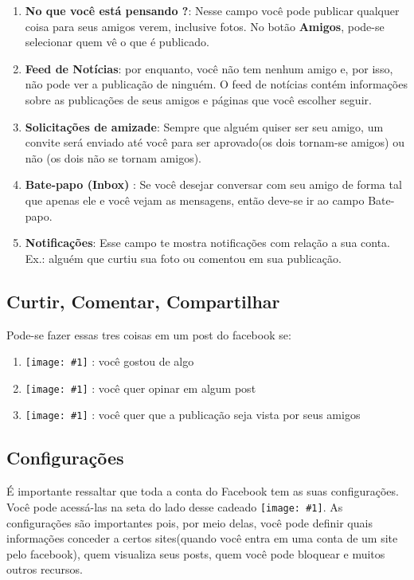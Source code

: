 \documentclass[hidelinks,12pt]{article}
\newcommand{\icon}[1]{\texttt{[image: \#1]}}
\begin{document}
		\begin{enumerate}
			\item \textbf{No que você está pensando ?}: Nesse campo você pode publicar qualquer coisa para seus amigos verem, inclusive fotos. No botão \textbf{Amigos}, pode-se selecionar quem vê o que é publicado.
			\item \textbf{Feed de Notícias}: por enquanto, você não tem nenhum amigo e, por isso, não pode ver a publicação de ninguém. O feed de notícias contém informações sobre as publicações de seus amigos e páginas que você escolher seguir.
			\item \textbf{Solicitações de amizade}: Sempre que alguém quiser ser seu amigo, um convite será enviado até você para ser aprovado(os dois tornam-se amigos) ou não (os dois não se tornam amigos).
			\item \textbf{Bate-papo (Inbox) }: Se você desejar conversar com seu amigo de forma tal que apenas ele e você vejam as mensagens, então deve-se ir ao campo Bate-papo.
			\item \textbf{Notificações}: Esse campo te mostra notificações com relação a sua conta. Ex.: alguém que curtiu sua foto ou comentou em sua publicação.
		\end{enumerate}

		\subsection{Curtir, Comentar, Compartilhar}

			Pode-se fazer essas tres coisas em um post do facebook se:

		\begin{enumerate}
			\item  \icon{Figures/curtir} : você gostou de algo
			\item  \icon{Figures/comentar} : você quer opinar em algum post
			\item  \icon{Figures/compartilhar} : você quer que a publicação seja vista por seus amigos
		\end{enumerate}

		\subsection{Configurações}

		É importante ressaltar que toda a conta do Facebook tem as suas configurações. Você pode acessá-las na seta do lado desse cadeado \icon{Figures/fb5}.
		As configurações são importantes pois, por meio delas,  você pode definir quais informações conceder a certos sites(quando você entra em uma conta de um site pelo facebook), quem visualiza seus posts, quem você pode bloquear e muitos outros recursos.
\end{document}
